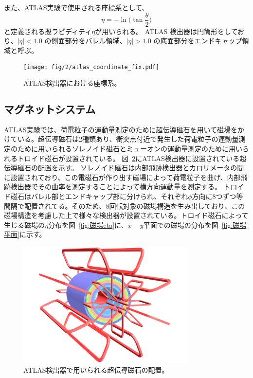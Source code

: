 また、ATLAS実験で使用される座標系として、
\begin{equation}
　\eta=-\ln\bigg(\tan\frac{\theta}{2}\bigg)
　\label{ラピディティ}
\end{equation}
と定義される擬ラピディティ$\eta$が用いられる。
ATLAS 検出器は円筒形をしており、$|\eta| < 1.0$ の側面部分をバレル領域、$|\eta| > 1.0$ の底面部分をエンドキャップ領域と呼ぶ。

\begin{figure}[tb]
  \centering
  \texttt{[image: fig/2/atlas\_coordinate\_fix.pdf]}
  \caption{ATLAS検出器における座標系。}
  \label{fig:a}
\end{figure}

\newpage
\subsection{マグネットシステム}\label{magnetic_filed}
ATLAS実験では、荷電粒子の運動量測定のために超伝導磁石を用いて磁場をかけている。超伝導磁石は2種類あり、衝突点付近で発生した荷電粒子の運動量測定のために用いられるソレノイド磁石とミューオンの運動量測定のために用いられるトロイド磁石が設置されている。
図~\ref{fig:磁石}にATLAS検出器に設置されている超伝導磁石の配置を示す。
ソレノイド磁石は内部飛跡検出器とカロリメータの間に設置されており、この電磁石が作り出す磁場によって荷電粒子を曲げ、内部飛跡検出器でその曲率を測定することによって横方向運動量を測定する。
トロイド磁石はバレル部とエンドキャップ部に分けられ、それぞれ$\phi$方向に8つずつ等間隔で配置されてる。そのため、8回転対象の磁場構造を生み出しており、この磁場構造を考慮した上で様々な検出器が設置されている。トロイド磁石によって生じる磁場の$\eta$分布を図~\ref{fig:磁場eta}に、$x-y$平面での磁場の分布を図~\ref{fig:磁場平面}に示す。



\begin{figure}[tb]
  \centering
  \includegraphics[clip, width=9cm]{fig/2/ATLcoilGeom.pdf}
  \caption{ATLAS検出器で用いられる超伝導磁石の配置\cite{Aad:1129811}。}
  \label{fig:磁石}
\end{figure}

